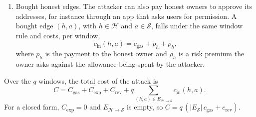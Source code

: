 \begin{enumerate}
\item Bought honest edges. The attacker can also pay honest owners to approve its addresses, for instance through an app that asks users for permission. A bought edge $(h,a)$, with $h\in\mathcal{H}$ and $a\in\mathcal{S}$, falls under the same window rule and costs, per window,
\begin{equation}
\label{eq:marginal}
c_{\mathrm{in}}(h,a) = c_{\mathrm{gas}} + p_h + \rho_h,
\end{equation}
where $p_h$ is the payment to the honest owner and $\rho_h$ is a risk premium the owner asks against the allowance being spent by the attacker.
\end{enumerate}

Over the $q$ windows, the total cost of the attack is
\begin{equation}
\label{eq:total-cost}
C = C_{\mathrm{gas}} + C_{\mathrm{exp}} + C_{\mathrm{rev}} + q\sum_{(h,a)\in E_{\mathcal{H}\to\mathcal{S}}} c_{\mathrm{in}}(h,a).
\end{equation}
For a closed farm, $C_{\mathrm{exp}}=0$ and $E_{\mathcal{H}\to\mathcal{S}}$ is empty, so $C=q\,(|E_{\mathcal{S}}|\,c_{\mathrm{gas}}+c_{\mathrm{rev}})$.


